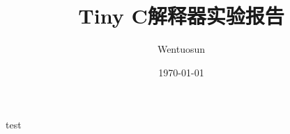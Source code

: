 \documentclass{report}
\begin{document}
\title{Tiny C解释器实验报告}
\author{Wentuosun}
\date{\today}
test
\end{document}
